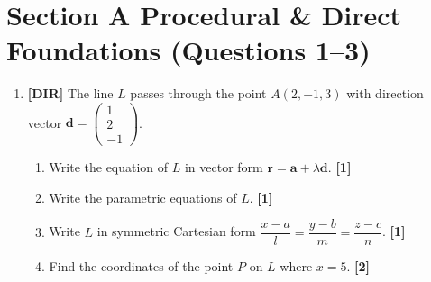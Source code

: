 \documentclass[11pt,a4paper]{article}
\begin{document}
\thispagestyle{plain}


\section*{Section A \quad Procedural \& Direct Foundations \hfill{\normalfont\footnotesize(Questions 1--3)}}
\begin{enumerate}
\item \textbf{[DIR]} The line $L$ passes through the point $A(2, -1, 3)$ with direction vector $\mathbf{d} = \begin{pmatrix} 1 \\ 2 \\ -1 \end{pmatrix}$.
\begin{enumerate}
  \item Write the equation of $L$ in vector form $\mathbf{r} = \mathbf{a} + \lambda\mathbf{d}$. \hfill{\small\textbf{[1]}}
  \item Write the parametric equations of $L$. \hfill{\small\textbf{[1]}}
  \item Write $L$ in symmetric Cartesian form $\dfrac{x-a}{l} = \dfrac{y-b}{m} = \dfrac{z-c}{n}$. \hfill{\small\textbf{[1]}}
  \item Find the coordinates of the point $P$ on $L$ where $x = 5$. \hfill{\small\textbf{[2]}}
\end{enumerate}

\begin{center}
\end{center}
\end{enumerate}
\end{document}
